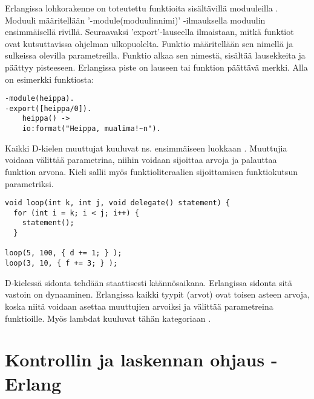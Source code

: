 \documentclass[11pt,oneside,a4paper]{article}
\begin{document}
Erlangissa lohkorakenne on toteutettu funktioita sisältävillä moduuleilla
\cite{HEB13}. Moduuli määritellään '-module(moduulin\textunderscore nimi)'
-ilmauksella moduulin ensimmäisellä rivillä.
Seuraavaksi 'export'-lauseella ilmaistaan, mitkä funktiot ovat kutsuttavissa
ohjelman ulkopuolelta. Funktio määritellään sen nimellä ja sulkeissa olevilla
parametreilla. Funktio alkaa sen nimestä, sisältää lausekkeita ja päättyy
pisteeseen. Erlangissa piste on lauseen tai funktion päättävä merkki. Alla on
esimerkki funktiosta:
\begin{verbatim}
-module(heippa).
-export([heippa/0]).
    heippa() ->
    io:format("Heippa, mualima!~n").
\end{verbatim}Kaikki D-kielen muuttujat kuuluvat ns. ensimmäiseen luokkaan \cite{DLA13}.
Muuttujia voidaan välittää parametrina, niihin voidaan sijoittaa arvoja ja
palauttaa funktion arvona. Kieli sallii myös funktioliteraalien sijoittamisen
funktiokutsun parametriksi.


\begin{verbatim}
void loop(int k, int j, void delegate() statement) { 
  for (int i = k; i < j; i++) { 
    statement(); 
  }
  
loop(5, 100, { d += 1; } ); 
loop(3, 10, { f += 3; } );
\end{verbatim}
D-kielessä sidonta tehdään staattisesti käännösaikana. Erlangissa sidonta sitä
vastoin on
dynaaminen. Erlangissa kaikki tyypit (arvot) ovat toisen asteen arvoja, koska
niitä voidaan asettaa muuttujien arvoiksi ja välittää parametreina funktioille.
Myös lambdat kuuluvat tähän kategoriaan \cite{HEB13}. 


\section{Kontrollin ja laskennan ohjaus - Erlang}
\end{document}
